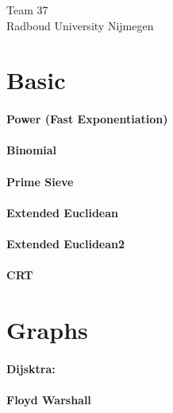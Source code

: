 \documentclass[a4paper]{article}
\begin{document}
\null\vfill
\begin{center}
{\huge Team 37}\\
\vspace{10cm}
{\large Radboud University Nijmegen}
\end{center}
\vfill
\thispagestyle{empty} %
\newpage

\clearpage
\setcounter{page}{1}

\tableofcontents
\newpage

\section{Basic} 
\paragraph{Power (Fast Exponentiation)} \hfill

\paragraph{Binomial} \hfill

\paragraph{Prime Sieve} \hfill

\paragraph{Extended Euclidean} \hfill

\paragraph{Extended Euclidean2} \hfill

\paragraph{CRT} \hfill

\section{Graphs}
\paragraph{Dijsktra:} \hfill

\paragraph{Floyd Warshall} \hfill

\end{document}
